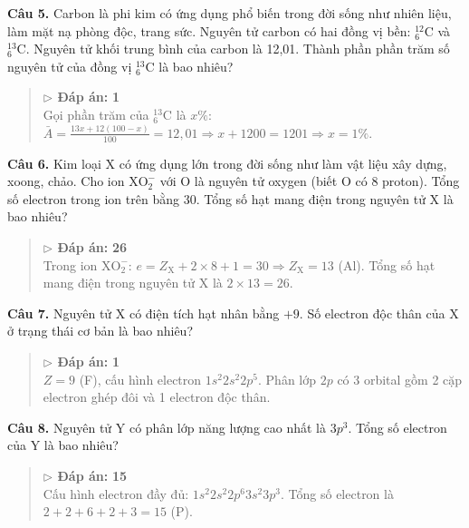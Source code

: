 \documentclass[11pt,a4paper]{article}
\begin{document}
\textbf{Câu 5.} Carbon là phi kim có ứng dụng phổ biến trong đời sống như nhiên liệu, làm mặt nạ phòng độc, trang sức. Nguyên tử carbon có hai đồng vị bền: $^{12}_6\text{C}$ và $^{13}_6\text{C}$. Nguyên tử khối trung bình của carbon là 12,01. Thành phần phần trăm số nguyên tử của đồng vị $^{13}_6\text{C}$ là bao nhiêu?\\
\begin{quote}\small
{\color{myBlue}\textbf{$\triangleright$ Đáp án:}} \textbf{\color{red} 1}\\
Gọi phần trăm của $^{13}_6\text{C}$ là $x\%$: $\bar{A} = \frac{13x + 12(100 - x)}{100} = 12,01 \Rightarrow x + 1200 = 1201 \Rightarrow x = 1\%$.
\end{quote}


\textbf{Câu 6.} Kim loại X có ứng dụng lớn trong đời sống như làm vật liệu xây dựng, xoong, chảo. Cho ion $\text{XO}_2^-$ với O là nguyên tử oxygen (biết O có 8 proton). Tổng số electron trong ion trên bằng 30. Tổng số hạt mang điện trong nguyên tử X là bao nhiêu?\\
\begin{quote}\small
{\color{myBlue}\textbf{$\triangleright$ Đáp án:}} \textbf{\color{red} 26}\\
Trong ion $\text{XO}_2^-$: $e = Z_\text{X} + 2 \times 8 + 1 = 30 \Rightarrow Z_\text{X} = 13$ (Al). Tổng số hạt mang điện trong nguyên tử X là $2 \times 13 = 26$.
\end{quote}


\textbf{Câu 7.} Nguyên tử X có điện tích hạt nhân bằng $+9$. Số electron độc thân của X ở trạng thái cơ bản là bao nhiêu?\\
\begin{quote}\small
{\color{myBlue}\textbf{$\triangleright$ Đáp án:}} \textbf{\color{red} 1}\\
$Z = 9$ (F), cấu hình electron $1s^2 2s^2 2p^5$. Phân lớp $2p$ có 3 orbital gồm 2 cặp electron ghép đôi và 1 electron độc thân.
\end{quote}


\textbf{Câu 8.} Nguyên tử Y có phân lớp năng lượng cao nhất là $3p^3$. Tổng số electron của Y là bao nhiêu?\\
\begin{quote}\small
{\color{myBlue}\textbf{$\triangleright$ Đáp án:}} \textbf{\color{red} 15}\\
Cấu hình electron đầy đủ: $1s^2 2s^2 2p^6 3s^2 3p^3$. Tổng số electron là $2 + 2 + 6 + 2 + 3 = 15$ (P).
\end{quote}
\end{document}
